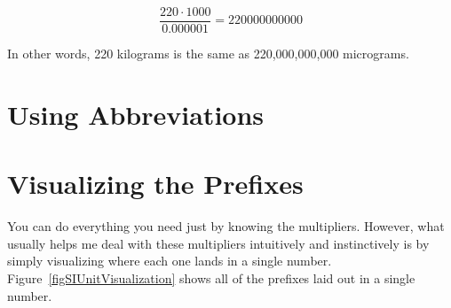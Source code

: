 $$\frac{220 \cdot 1000}{0.000001} = 220000000000$$

In other words, 220 kilograms is the same as 220,000,000,000 micrograms.

\section{Using Abbreviations}

\section{Visualizing the Prefixes}

You can do everything you need just by knowing the multipliers.
However, what usually helps me deal with these multipliers intuitively and instinctively is by simply visualizing where each one lands in a single number.
Figure~\ref{figSIUnitVisualization} shows all of the prefixes laid out in a single number.


\applysection


